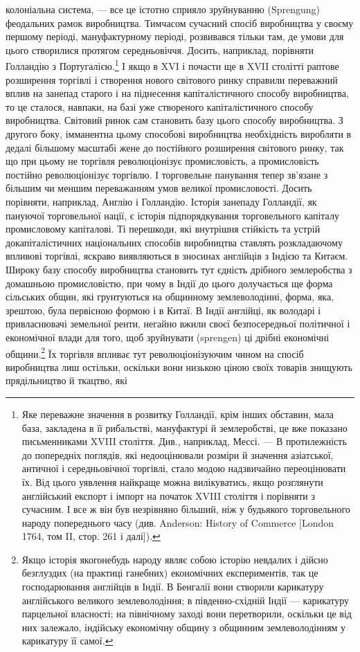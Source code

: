 колоніальна система, — все це істотно сприяло зруйнуванню
(Sprengung) феодальних рамок виробництва. Тимчасом сучасний
спосіб виробництва у своєму першому періоді, мануфактурному
періоді, розвивався тільки там, де умови для цього створилися
протягом середньовіччя. Досить, наприклад, порівняти Голландію
з Португалією.\footnote{
Яке переважне значення в розвитку Голландії, крім інших обставин,
мала база, закладена в її рибальстві, мануфактурі й землеробстві, це вже показано
письменниками XVIII століття. Див., наприклад, Мессі. — В протилежність
до попередніх поглядів, які недооцінювали розміри й значення азіатської, античної
і середньовічної торгівлі, стало модою надзвичайно переоцінювати їх.
Від цього уявлення найкраще можна вилікуватись, якщо розглянути англійський
експорт і імпорт на початок XVIII століття і порівняти з сучасним. І все ж
він був незрівняно більший, ніж у будьякого торговельного народу попереднього
часу (див. Anderson: History of Commerce [London 1764, том II, стор. 261
і далі]).
} І якщо в XVI і почасти ще в XVII столітті
раптове розширення торгівлі і створення нового світового ринку
справили переважний вплив на занепад старого і на піднесення
капіталістичного способу виробництва, то це сталося, навпаки,
на базі уже створеного капіталістичного способу виробництва.
Світовий ринок сам становить базу цього способу виробництва.
З другого боку, імманентна цьому способові виробництва необхідність
виробляти в дедалі більшому масштабі жене до постійного
розширення світового ринку, так що при цьому не торгівля
революціонізує промисловість, а промисловість постійно революціонізує
торгівлю. І торговельне панування тепер зв’язане
з більшим чи меншим переважанням умов великої промисловості.
Досить порівняти, наприклад, Англію і Голландію. Історія занепаду
Голландії, як пануючої торговельної нації, є історія підпорядкування
торговельного капіталу промисловому капіталові.
Ті перешкоди, які внутрішня стійкість та устрій докапіталістичних
національних способів виробництва ставлять розкладаючому
впливові торгівлі, яскраво виявляються в зносинах англійців
з Індією та Китаєм. Широку базу способу виробництва
становить тут єдність дрібного землеробства з домашньою промисловістю,
при чому в Індії до цього долучається ще форма
сільських общин, які грунтуються на общинному землеволодінні,
форма, яка, зрештою, була первісною формою і в Китаї.
В Індії англійці, як володарі і привласнювачі земельної ренти,
негайно вжили своєї безпосередньої політичної і економічної
влади для того, щоб зруйнувати (sprengen) ці дрібні економічні
общини.\footnote{
Якщо історія якогонебудь народу являє собою історію невдалих і дійсно
безглуздих (на практиці ганебних) економічних експериментів, так це господарювання
англійців в Індії. В Бенгалії вони створили карикатуру англійського
великого землеволодіння; в південно-східній Індії — карикатуру парцельної
власності; на північному заході вони перетворили, оскільки це від них залежало,
індійську економічну общину з общинним землеволодінням у карикатуру її
самої.
} Їх торгівля впливає тут революціонізуючим чином
на спосіб виробництва лиш остільки, оскільки вони низькою
ціною своїх товарів знищують прядільництво й ткацтво, які